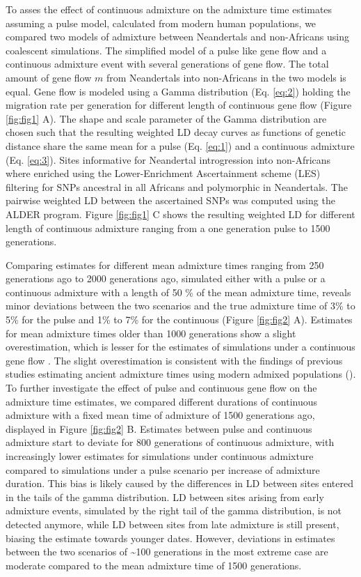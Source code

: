 \documentclass[]{article}
\begin{document}
To asses the effect of continuous admixture on the admixture
time estimates assuming a pulse model, calculated from modern human populations, we compared two
models of admixture between Neandertals and non-Africans using
coalescent simulations. The simplified model of a pulse like gene flow
and a continuous admixture event with several generations of gene flow.
The total amount of gene flow \(m\) from Neandertals into non-Africans
in the two models is equal. Gene flow is modeled using a Gamma
distribution (Eq. \ref{eq:2}) holding the migration rate per generation
for different length of continuous gene flow (Figure \ref{fig:fig1} A).
The shape and scale parameter of the Gamma distribution are chosen such
that the resulting weighted LD decay curves as functions of genetic
distance share the same mean for a pulse (Eq. \ref{eq:1}) and a
continuous admixture (Eq. \ref{eq:3}). Sites informative for Neandertal
introgression into non-Africans where enriched using the
Lower-Enrichment Ascertainment scheme (LES) filtering for SNPs ancestral in
all Africans and polymorphic in Neandertals. The pairwise weighted LD
between the ascertained SNPs was computed using the ALDER program.
Figure \ref{fig:fig1} C shows the resulting weighted LD for different
length of continuous admixture ranging from a one generation pulse to
1500 generations.

Comparing estimates for different mean admixture times ranging from 250
generations ago to 2000 generations ago, simulated either with a pulse
or a continuous admixture with a length of 50 \% of the mean admixture
time, reveals minor deviations between the two scenarios and the true
admixture time of 3\% to 5\% for the pulse and 1\% to 7\% for the
continuous (Figure \ref{fig:fig2} A). Estimates for mean admixture times
older than 1000 generations show a slight overestimation, which is
lesser for the estimates of simulations under a continuous gene flow .
The slight overestimation is consistent with the findings of previous
studies estimating ancient admixture times using modern admixed
populations
(\cite{sankararaman_date_2012,fu_genome_2014,moorjani_genetic_2016}). To
further investigate the effect of pulse and continuous gene flow on the
admixture time estimates, we compared different durations of continuous
admixture with a fixed mean time of admixture of 1500
generations ago, displayed in Figure \ref{fig:fig2} B. Estimates between
pulse and continuous admixture start to deviate for 800 generations of
continuous admixture, with increasingly lower estimates for simulations
under continuous admixture compared to simulations under a pulse scenario per increase of admixture duration. This bias is likely caused
by the differences in LD between sites entered in the tails of the gamma
distribution. LD between sites arising from early admixture events,
simulated by the right tail of the gamma distribution, is not detected
anymore, while LD between sites from late admixture is still present,
biasing the estimate towards younger dates. However, deviations in
estimates between the two scenarios of \textasciitilde{}100 generations
in the most extreme case are moderate compared to the mean admixture
time of 1500 generations.
\end{document}
